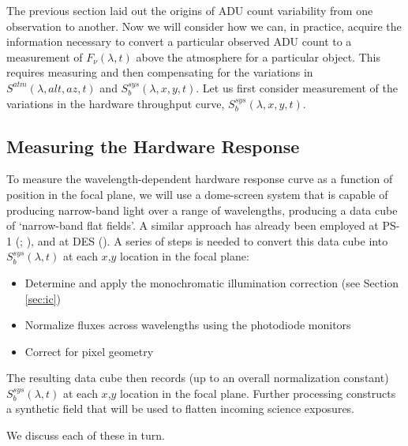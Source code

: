 \documentclass[12pt,preprint]{aastex}
\begin{document}
The previous section laid out the origins of ADU count variability
from one observation to another. Now we will consider how we can, in
practice, acquire the information necessary to convert a particular
observed ADU count to a measurement of $F_\nu(\lambda,t)$ above the
atmosphere for a particular object.  This requires measuring and then 
compensating for the variations in
$S^{atm}(\lambda,alt,az,t)$ and $S_b^{sys}(\lambda,x,y,t)$.
Let us first consider measurement of the variations in the hardware
throughput curve, $S_b^{sys}(\lambda,x,y,t)$. 



\subsection{Measuring the Hardware Response}
\label{sec:hdw_response}
To measure the wavelength-dependent hardware response
curve as a function of position in the focal plane, we will use a
dome-screen system that is capable of producing narrow-band light 
over a range of wavelengths, producing a data cube of `narrow-band flat
fields'.  A similar approach has already been employed at PS-1 (\citep{StubbsTonry2012}; \citep{Tonry2012}), 
and at DES (\citep{Marshall2013}).  A series of steps is needed to convert this data cube into
$S_b^{sys}(\lambda,t)$ at each $x$,$y$ location in the focal plane:

\begin{itemize}
\item{Determine and apply the monochromatic illumination correction (see Section \ref{sec:ic})}
\item{Normalize fluxes across wavelengths using the photodiode monitors}
\item{Correct for pixel geometry}
\end{itemize}

The resulting data cube then
records (up to an overall normalization constant) $S_b^{sys}(\lambda,t)$ at each $x$,$y$ location in the focal plane. 
Further processing constructs a synthetic field that will be used to flatten incoming science exposures.

We discuss each of these in turn.
\end{document}
